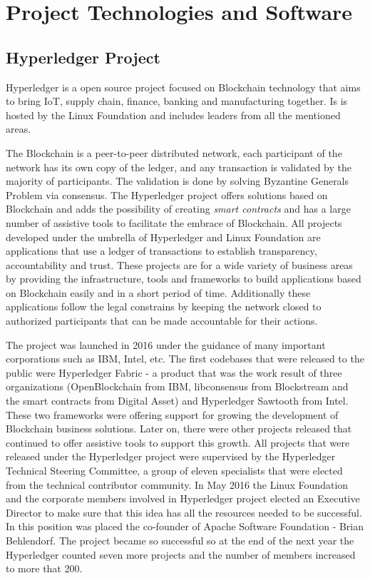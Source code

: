 \chapter{Project Technologies and Software}
\label{chapter:chapter2}

\section{Hyperledger Project}
\label{sub-sec:chapter1-section1}
Hyperledger is a open source project focused on Blockchain technology that aims to bring IoT, supply chain, finance, banking and manufacturing together. Is is hosted by the Linux Foundation and includes leaders from all the mentioned areas.

The Blockchain is a peer-to-peer distributed network, each participant of the network has its own copy of the ledger, and any transaction is validated by the majority of participants. The validation is done by solving Byzantine Generals Problem via consensus.
The Hyperledger project offers solutions based on Blockchain and adds the possibility of creating \emph{smart contracts} and has a large number of assistive tools to facilitate the embrace of Blockchain.
All projects developed under the umbrella of Hyperledger and Linux Foundation are applications that use a ledger of transactions to establish transparency, accountability and trust. These projects are for a wide variety of business areas by providing the infrastructure, tools and frameworks to build applications based on Blockchain easily and in a short period of time. Additionally these applications follow the legal constrains by keeping the network closed to authorized participants that can be made accountable for their actions.

The project was launched in 2016 under the guidance of many important corporations such as IBM, Intel, etc. The first codebases that were released to the public were Hyperledger Fabric - a product that was the work result of three organizations (OpenBlockchain from IBM, libconsensus from Blockstream and the smart contracts from Digital Asset) and Hyperledger Sawtooth from Intel. 
These two frameworks were offering support for growing the development of Blockchain business solutions. Later on, there were other projects released that continued to offer assistive tools to support this growth. All projects that were released under the Hyperledger project were supervised by the Hyperledger Technical Steering Committee, a group of eleven specialists that were elected from the technical contributor community.
In May 2016 the Linux Foundation and the corporate members involved in Hyperledger project elected an Executive Director to make sure that this idea has all the resources needed to be successful. In this position was placed the co-founder of Apache Software Foundation - Brian Behlendorf. 
The project became so successful so at the end of the next year the Hyperledger counted seven more projects and the number of members increased to more that 200.

